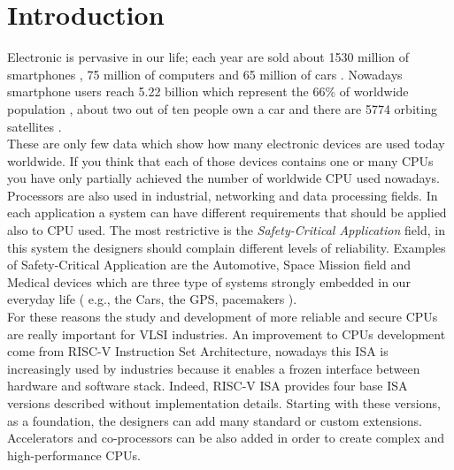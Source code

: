 \chapter{Introduction}{
	\label{chap:Intro}
	Electronic is pervasive in our life; each year are sold about 1530 million of smartphones , 75 million of computers  and  65 million of cars .
	Nowadays smartphone users reach 5.22 billion which represent the 66\% of worldwide population , about two out of ten people own a car  and there are 5774 orbiting satellites .\\
	
	These are only few data which show how many electronic devices are used today worldwide. If you think that each of those devices contains one or many CPUs you have only partially achieved the number of worldwide CPU used nowadays.\\
	
	Processors are also used in industrial, networking and data processing fields. In each application a system can have different requirements that should be applied also to CPU used. The most restrictive is the \textit{Safety-Critical Application} field, in this system the designers should complain different levels of reliability. Examples of Safety-Critical Application are the Automotive, Space Mission field and Medical devices which are three type of systems strongly embedded in our everyday life ( e.g., the Cars, the GPS, pacemakers ).\\
	
	For these reasons the study and development of more reliable and secure CPUs are really important for VLSI industries. An improvement to CPUs development come from RISC-V Instruction Set Architecture, nowadays this ISA is increasingly used by industries because it enables a frozen interface between hardware and software stack. Indeed, RISC-V ISA provides four base ISA versions described without implementation details. Starting with these versions, as a foundation, the designers can add many standard or custom extensions. Accelerators and co-processors can be also added in order to create complex and high-performance CPUs.\\
	
}
